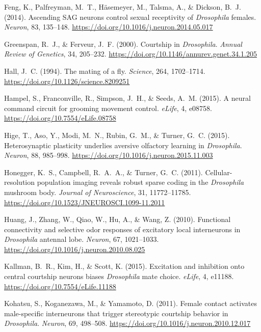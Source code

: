 Feng, K., Palfreyman, M.~T., H\"{a}semeyer, M., Talsma, A., \& Dickson, B.~J. (2014). Ascending SAG neurons control sexual receptivity of \emph{Drosophila} females. \emph{Neuron}, 83, 135--148. \url{https://doi.org/10.1016/j.neuron.2014.05.017}

Greenspan, R.~J., \& Ferveur, J.~F. (2000). Courtship in \emph{Drosophila}. \emph{Annual Review of Genetics}, 34, 205--232. \url{https://doi.org/10.1146/annurev.genet.34.1.205}

Hall, J.~C. (1994). The mating of a fly. \emph{Science}, 264, 1702--1714. \url{https://doi.org/10.1126/science.8209251}

Hampel, S., Franconville, R., Simpson, J.~H., \& Seeds, A.~M. (2015). A neural command circuit for grooming movement control. \emph{eLife}, 4, e08758. \url{https://doi.org/10.7554/eLife.08758}

Hige, T., Aso, Y., Modi, M.~N., Rubin, G.~M., \& Turner, G.~C. (2015). Heterosynaptic plasticity underlies aversive olfactory learning in \emph{Drosophila}. \emph{Neuron}, 88, 985--998. \url{https://doi.org/10.1016/j.neuron.2015.11.003}

Honegger, K.~S., Campbell, R.~A.~A., \& Turner, G.~C. (2011). Cellular-resolution population imaging reveals robust sparse coding in the \emph{Drosophila} mushroom body. \emph{Journal of Neuroscience}, 31, 11772--11785. \url{https://doi.org/10.1523/JNEUROSCI.1099-11.2011}

Huang, J., Zhang, W., Qiao, W., Hu, A., \& Wang, Z. (2010). Functional connectivity and selective odor responses of excitatory local interneurons in \emph{Drosophila} antennal lobe. \emph{Neuron}, 67, 1021--1033. \url{https://doi.org/10.1016/j.neuron.2010.08.025}

Kallman, B.~R., Kim, H., \& Scott, K. (2015). Excitation and inhibition onto central courtship neurons biases \emph{Drosophila} mate choice. \emph{eLife}, 4, e11188. \url{https://doi.org/10.7554/eLife.11188}

Kohatsu, S., Koganezawa, M., \& Yamamoto, D. (2011). Female contact activates male-specific interneurons that trigger stereotypic courtship behavior in \emph{Drosophila}. \emph{Neuron}, 69, 498--508. \url{https://doi.org/10.1016/j.neuron.2010.12.017}


